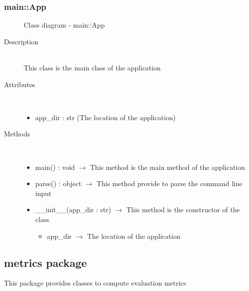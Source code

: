 \subsubsection[App]{main::App}
\begin{figure}[h]
\centering
{}
\caption{Class diagram - main::App}
\end{figure}\begin{description}
\item[Description] \hfill \\
 This class is the main class of the application
\item[Attributes] \hfill \\
 \vspace{-1cm}
\begin{itemize}
\item app\_dir : str (The location of the application)
\end{itemize}

\item[Methods] \hfill \\
 \vspace{-1cm}
\begin{itemize}
\item main() : void $\rightarrow$ This method is the main method of the application
\item parse() : object $\rightarrow$ This method provide to parse the command line input
\item \_\_init\_\_(app\_dir : str) $\rightarrow$ This method is the constructor of the class\begin{itemize}
\item app\_dir $\rightarrow$ The location of the application
\end{itemize}

\end{itemize}

\end{description}
\subsection{metrics package}
This package provides classes to compute evaluation metrics

\hypertarget{metrics::Metrics}{}

